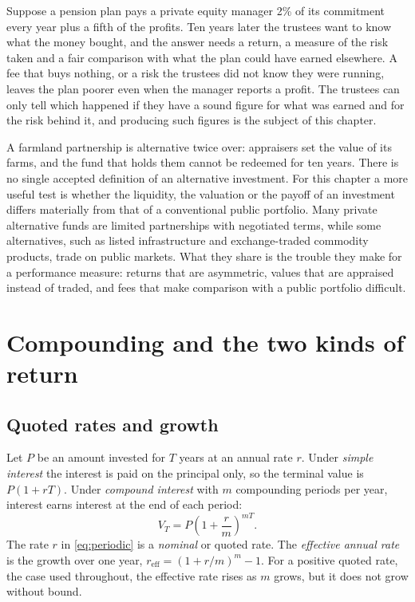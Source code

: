 \begin{chapterrefs}
Suppose a pension plan pays a private equity manager 2\% of its commitment every year plus a fifth
of the profits. Ten years later the trustees want to know what the money bought, and the answer
needs a return, a measure of the risk taken and a fair comparison with what the plan could have
earned elsewhere. A fee that buys nothing, or a risk the trustees did not know they were running,
leaves the plan poorer even when the manager reports a profit. The trustees can only tell which
happened if they have a sound figure for what was earned and for the risk behind it, and producing
such figures is the subject of this chapter.

A farmland partnership is alternative twice over: appraisers set the value of its farms, and the
fund that holds them cannot be redeemed for ten years. There is no single accepted definition of an
alternative investment. For this chapter a more useful test is
whether the liquidity, the valuation or the payoff of an investment differs materially from that of
a conventional public portfolio. Many private alternative funds are limited partnerships with negotiated terms, while some
alternatives, such as listed
infrastructure and exchange-traded commodity products, trade on public markets. What they share is
the trouble they make for a performance measure: returns that are asymmetric, values that are
appraised instead of traded, and fees that make comparison with a public portfolio difficult.

\FloatBarrier
\section{Compounding and the two kinds of return}
\label{sec:rates}

\subsection{Quoted rates and growth}

Let $P$ be an amount invested for $T$ years at an annual rate $r$. Under \emph{simple interest} the
interest is paid on the principal only, so the terminal value is $P(1+rT)$. Under \emph{compound
interest} with $m$ compounding periods per year, interest earns interest at the end of each period:
\begin{equation}\label{eq:periodic}
  V_T = P\left(1+\frac{r}{m}\right)^{mT}.
\end{equation}
The rate $r$ in \cref{eq:periodic} is a \emph{nominal} or quoted rate. The \emph{effective annual rate}
is the growth over one year, $r_{\mathrm{eff}} = (1+r/m)^m - 1$. For a positive quoted rate, the case
used throughout, the effective rate rises as $m$ grows, but it does not grow without bound.


\end{chapterrefs}
